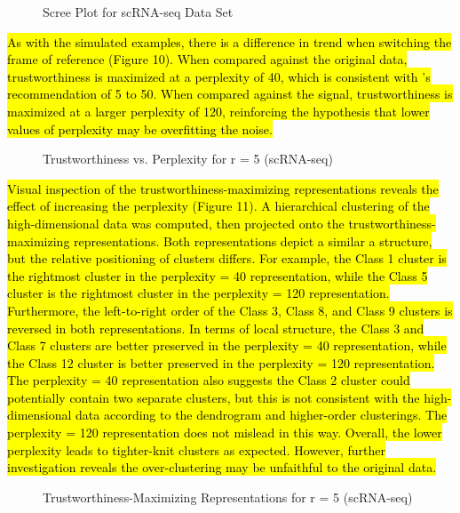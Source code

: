 \documentclass{article}
\begin{document}
\renewcommand{\thefigure}{9}
\begin{figure}[H]
\centering
\caption{Scree Plot for scRNA-seq Data Set}
\end{figure}

\hl{As with the simulated examples, there is a difference in trend when switching the frame of reference (Figure 10). When compared against the original data, trustworthiness is maximized at a perplexity of 40, which is consistent with {\cite{t-SNE}}'s recommendation of 5 to 50. When compared against the signal, trustworthiness is maximized at a larger perplexity of 120, reinforcing the hypothesis that lower values of perplexity may be overfitting the noise.}

\renewcommand{\thefigure}{10}
\begin{figure}[H]
\centering
\caption{Trustworthiness vs. Perplexity for r = 5 (scRNA-seq)}
\end{figure}

\hl{Visual inspection of the trustworthiness-maximizing representations reveals the effect of increasing the perplexity (Figure 11). A hierarchical clustering of the high-dimensional data was computed, then projected onto the trustworthiness-maximizing representations. Both representations depict a similar a structure, but the relative positioning of clusters differs. For example, the Class 1 cluster is the rightmost cluster in the perplexity = 40 representation, while the Class 5 cluster is the rightmost cluster in the perplexity = 120 representation. Furthermore, the left-to-right order of the Class 3, Class 8, and Class 9 clusters is reversed in both representations. In terms of local structure, the Class 3 and Class 7 clusters are better preserved in the perplexity = 40 representation, while the Class 12 cluster is better preserved in the perplexity = 120 representation. The perplexity = 40 representation also suggests the Class 2 cluster could potentially contain two separate clusters, but this is not consistent with the high-dimensional data according to the dendrogram and higher-order clusterings. The perplexity = 120 representation does not mislead in this way. Overall, the lower perplexity leads to tighter-knit clusters as expected. However, further investigation reveals the over-clustering may be unfaithful to the original data.}

\renewcommand{\thefigure}{11}
\begin{figure}[H]
\centering
\caption{Trustworthiness-Maximizing Representations for r = 5 (scRNA-seq)}
\end{figure}
\end{document}
